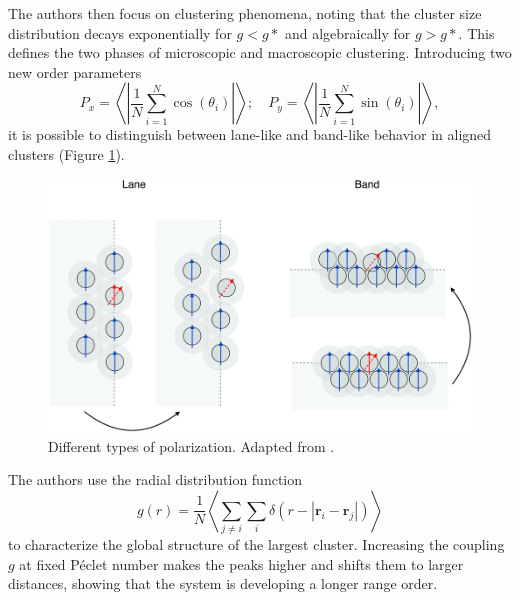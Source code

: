 \documentclass[../../master_thesis_np.tex]{subfiles}
\begin{document}
	The authors then focus on clustering phenomena, noting that the cluster size distribution decays exponentially for $g < g*$ and algebraically for $g > g*$. 
	This defines the two phases of microscopic and macroscopic clustering.
	Introducing two new order parameters
	\begin{equation} 
	P_x = \left\langle \left| \frac{1}{N} \sum_{i=1}^N \cos(\theta_i) \right| \right\rangle ; \quad
	P_y = \left\langle \left| \frac{1}{N} \sum_{i=1}^N \sin(\theta_i) \right| \right\rangle,
 	\end{equation}
 	it is possible to distinguish between lane-like and band-like behavior in aligned clusters (Figure \ref{fig:martin_flocking2}).
 
	 \begin{figure}[htp]
		 	\centering
		 	\includegraphics[width=\singfigwidth]{martin_laneband.png}
		 	\caption{Different types of polarization. Adapted from \cite{martin-gomez_collective_2018}.}
		 	\label{fig:martin_flocking2}
	 \end{figure}
	 
	 The authors use the radial distribution function 
	 \begin{equation} 
	 g(r) = \frac{1}{N} \left\langle \sum_{j \neq i} \sum_{i} \delta \left( r - |\mathbf{r}_i - \mathbf{r}_j| \right) \right\rangle
	 \end{equation}
	to characterize the global structure of the largest cluster. 
	Increasing the coupling $g$ at fixed Péclet number makes the peaks higher and shifts them to larger distances, showing that the system is developing a longer range order.
	
\end{document}
